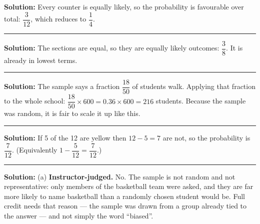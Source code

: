 \documentclass[12pt]{article}
\begin{document}



\textbf{Solution:} Every counter is equally likely, so the probability is
favourable over total: $\dfrac{3}{12}$, which reduces to
$\dfrac{1}{4}$. 

\vspace{0.25cm}\noindent\rule{\linewidth}{0.2pt}\vspace{0.25cm}


\textbf{Solution:} The sections are equal, so they are equally likely outcomes:
$\dfrac{3}{8}$. It is already in lowest terms. 

\vspace{0.25cm}\noindent\rule{\linewidth}{0.2pt}\vspace{0.25cm}


\textbf{Solution:} The sample says a fraction $\dfrac{18}{50}$ of students walk.
Applying that fraction to the whole school:
$\dfrac{18}{50} \times 600 = 0.36 \times 600 = 216$ students. Because the sample
was random, it is fair to scale it up like this. 

\vspace{0.25cm}\noindent\rule{\linewidth}{0.2pt}\vspace{0.25cm}


\textbf{Solution:} If 5 of the 12 are yellow then $12 - 5 = 7$ are not, so the
probability is $\dfrac{7}{12}$. (Equivalently
$1 - \dfrac{5}{12} = \dfrac{7}{12}$.) 

\vspace{0.25cm}\noindent\rule{\linewidth}{0.2pt}\vspace{0.25cm}


\textbf{Solution:} (a) \textbf{Instructor-judged.} No. The sample is not random
and not representative: only members of the basketball team were asked, and they
are far more likely to name basketball than a randomly chosen student would be.
Full credit needs that reason --- the sample was drawn from a group already tied
to the answer --- and not simply the word ``biased''.
\end{document}
